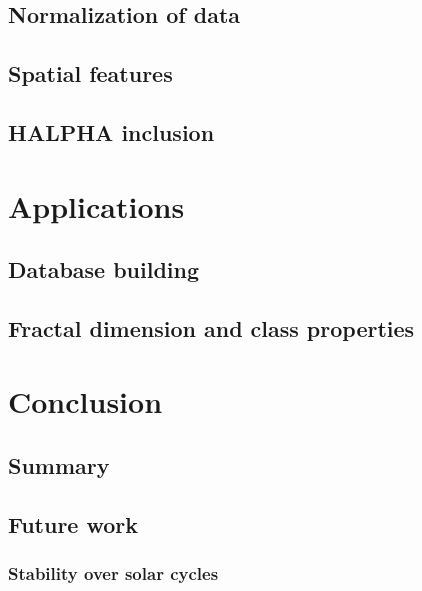 \documentclass[twoside]{report}
\begin{document}
\section{Normalization of data}

\section{Spatial features}

\section{HALPHA inclusion}

\chapter{Applications} \label{ch:application}

\section{Database building} \label{sec:database}

\section{Fractal dimension and class properties} \label{sec:fractal}

\chapter{Conclusion} \label{ch:conclusion}

\section{Summary}

\section{Future work}

\subsection{Stability over solar cycles}



\end{document}
